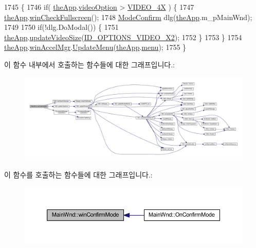 \begin{DoxyCode}
1745 \{
1746     \textcolor{keywordflow}{if}( \mbox{\hyperlink{_v_b_a_8cpp_a8095a9d06b37a7efe3723f3218ad8fb3}{theApp}}.\mbox{\hyperlink{class_v_b_a_a17dac073149c897f770c00ed7098ad32}{videoOption}} > \mbox{\hyperlink{_v_b_a_8h_a531c35e38ede3ea4e5ba5afb24b29493a6468bce6b84e6350d3de126f257eb38d}{VIDEO\_4X}} ) \{
1747         \mbox{\hyperlink{_v_b_a_8cpp_a8095a9d06b37a7efe3723f3218ad8fb3}{theApp}}.\mbox{\hyperlink{class_v_b_a_a340eaeeb7fcfc242f08ac3442d991a96}{winCheckFullscreen}}();
1748         \mbox{\hyperlink{class_mode_confirm}{ModeConfirm}} dlg(\mbox{\hyperlink{_v_b_a_8cpp_a8095a9d06b37a7efe3723f3218ad8fb3}{theApp}}.m\_pMainWnd);
1749         
1750         \textcolor{keywordflow}{if}(!dlg.DoModal()) \{
1751             \mbox{\hyperlink{_v_b_a_8cpp_a8095a9d06b37a7efe3723f3218ad8fb3}{theApp}}.\mbox{\hyperlink{class_v_b_a_afe121e9ee080eca73146eb339408a148}{updateVideoSize}}(\mbox{\hyperlink{resource_8h_a8b0028ea6bbbe3d1fbae96e17d0e9bdd}{ID\_OPTIONS\_VIDEO\_X2}});
1752         \}
1753     \}
1754     \mbox{\hyperlink{_v_b_a_8cpp_a8095a9d06b37a7efe3723f3218ad8fb3}{theApp}}.\mbox{\hyperlink{class_v_b_a_ad7ebce057dbde0ca88cee75e84721a89}{winAccelMgr}}.\mbox{\hyperlink{class_c_accelerator_manager_ac7411d20f413ea0ec3bd65705b564adf}{UpdateMenu}}(\mbox{\hyperlink{_v_b_a_8cpp_a8095a9d06b37a7efe3723f3218ad8fb3}{theApp}}.\mbox{\hyperlink{class_v_b_a_acf9d855b5b959a2df9c6cb21b888366e}{menu}});
1755 \}
\end{DoxyCode}
이 함수 내부에서 호출하는 함수들에 대한 그래프입니다.\+:
\nopagebreak
\begin{figure}[H]
\begin{center}
\leavevmode
\includegraphics[width=350pt]{class_main_wnd_ac2dd4c52f72943279a8d8338edc06343_cgraph}
\end{center}
\end{figure}
이 함수를 호출하는 함수들에 대한 그래프입니다.\+:
\nopagebreak
\begin{figure}[H]
\begin{center}
\leavevmode
\includegraphics[width=350pt]{class_main_wnd_ac2dd4c52f72943279a8d8338edc06343_icgraph}
\end{center}
\end{figure}

